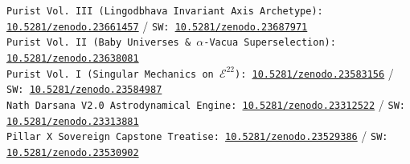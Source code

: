 \documentclass[11pt,a4paper,reqno]{article}
\theoremstyle{plain}
\theoremstyle{definition}
\theoremstyle{remark}
\numberwithin{equation}{section}
\numberwithin{table}{section}
\begin{document}
\begin{flushleft}
\texttt{Purist Vol.~III (Lingodbhava Invariant Axis Archetype): \href{https://doi.org/10.5281/zenodo.23661457}{10.5281/zenodo.23661457}} / \texttt{SW: \href{https://doi.org/10.5281/zenodo.23687971}{10.5281/zenodo.23687971}}\\
\texttt{Purist Vol.~II (Baby Universes \& $\alpha$-Vacua Superselection): \href{https://doi.org/10.5281/zenodo.23638081}{10.5281/zenodo.23638081}}\\
\texttt{Purist Vol.~I (Singular Mechanics on $\mathcal{E}^{22}$): \href{https://doi.org/10.5281/zenodo.23583156}{10.5281/zenodo.23583156}} / \texttt{SW: \href{https://doi.org/10.5281/zenodo.23584987}{10.5281/zenodo.23584987}}\\
\texttt{Nath Darsana V2.0 Astrodynamical Engine: \href{https://doi.org/10.5281/zenodo.23312522}{10.5281/zenodo.23312522}} / \texttt{SW: \href{https://doi.org/10.5281/zenodo.23313881}{10.5281/zenodo.23313881}}\\
\texttt{Pillar X Sovereign Capstone Treatise: \href{https://doi.org/10.5281/zenodo.23529386}{10.5281/zenodo.23529386}} / \texttt{SW: \href{https://doi.org/10.5281/zenodo.23530902}{10.5281/zenodo.23530902}}
\normalsize
\end{flushleft}
\end{document}
